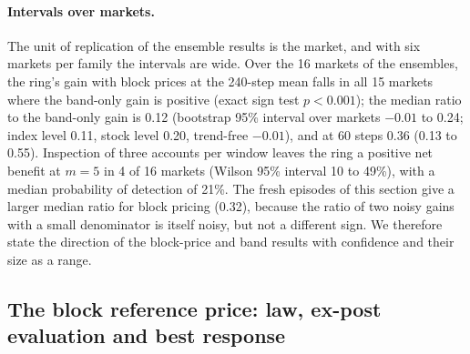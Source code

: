 \paragraph{Intervals over markets.} The unit of replication of the ensemble results is the market, and with six markets per family the intervals are wide. Over the 16 markets of the ensembles, the ring's gain with block prices at the 240-step mean falls in all 15 markets where the band-only gain is positive (exact sign test $p<0.001$); the median ratio to the band-only gain is 0.12 (bootstrap 95\% interval over markets $-0.01$ to 0.24; index level 0.11, stock level 0.20, trend-free $-0.01$), and at 60 steps 0.36 (0.13 to 0.55). Inspection of three accounts per window leaves the ring a positive net benefit at $m=5$ in 4 of 16 markets (Wilson 95\% interval 10 to 49\%), with a median probability of detection of 21\%. The fresh episodes of this section give a larger median ratio for block pricing (0.32), because the ratio of two noisy gains with a small denominator is itself noisy, but not a different sign. We therefore state the direction of the block-price and band results with confidence and their size as a range.

\begin{table}[t]
\centering\footnotesize
{}
\caption{The ring's best response with the menu of four strategies and with a menu of 28 (the four and 24 random ones): median gain against the band alone, ratio of the gain under block pricing at 240 steps to the gain with the band alone, and number of markets in which a ring facing inspection of three accounts per window keeps a positive net benefit at fine multiple 5. Two-stage selection and 12 fresh reporting episodes per cell}\label{tab:menurandom}
\end{table}

\subsection{The block reference price: law, ex-post evaluation and best response}\label{sec:blockcheck}

